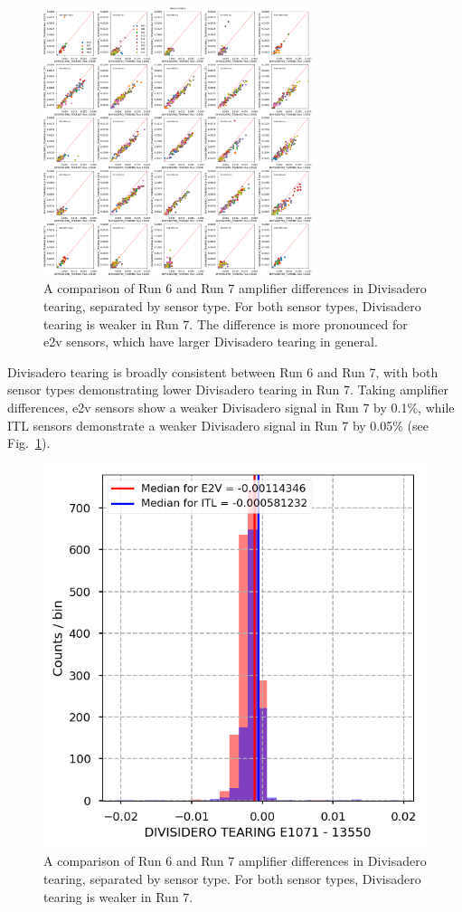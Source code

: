 \begin{figure}[ht]
\begin{centering}
\includegraphics[width=0.7\textwidth]{figures/baselineCharacterization/13550_E1071_DIVISADERO_TEARING_inset.png}
\caption{A comparison of Run 6 and Run 7 amplifier differences in Divisadero tearing, separated by sensor type. For both sensor types, Divisadero tearing is weaker in Run 7. The difference is more pronounced for e2v sensors, which have larger Divisadero tearing in general.}
\end{centering}
\end{figure}

Divisadero tearing is broadly consistent between Run 6 and Run 7, with both sensor types demonstrating lower Divisadero tearing in Run 7. Taking amplifier differences, e2v sensors show a weaker Divisadero signal in Run 7 by 0.1\%, while ITL sensors demonstrate a weaker Divisadero signal in Run 7 by 0.05\% (see Fig.~\ref{fig:divisidero_diff_baseline}).

\begin{figure}[ht]
    \centering
    \includegraphics[width=0.7\linewidth]{figures/baselineCharacterization/DIVISIDERO_TEARING_13550_E1071_diff.png}
    \caption{A comparison of Run 6 and Run 7 amplifier differences in Divisadero tearing, separated by sensor type. For both sensor types, Divisadero tearing is weaker in Run 7.}
    \label{fig:divisidero_diff_baseline}
\end{figure}

